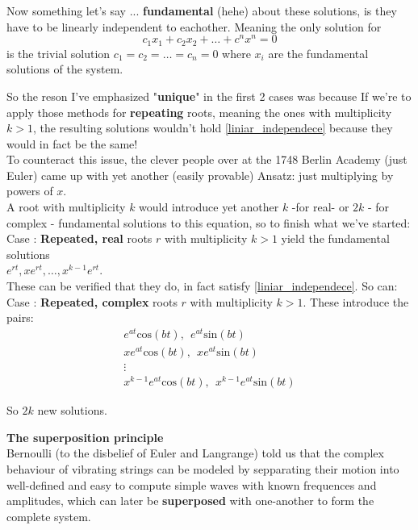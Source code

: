 Now something let's say ... \textbf{fundamental} (hehe) about these solutions, is they have to be linearly independent to eachother. Meaning the only solution for
\begin{equation}\label{liniar_independece}
    c_1 x_1+c_2 x_2 + \dots + c^n x^n = 0
\end{equation}
is the trivial solution $c_1=c_2=\dots=c_n=0$ where $x_i$ are the fundamental solutions of the system.

So the reson I've emphasized "\textbf{unique}" in the first 2 cases was because If we're to apply those methods for \textbf{repeating} roots, meaning the ones with multiplicity $k>1$, the resulting solutions wouldn't hold \ref{liniar_independece} because they would in fact be the same! \\

To counteract this issue, the clever people over at the 1748 Berlin Academy (just Euler) came up with yet another (easily provable) Ansatz: just multiplying by powers of $x$. \\

A root with multiplicity $k$ would introduce yet another $k$ -for real- or $2k$ - for complex - fundamental solutions to this equation, so to finish what we've started:\\

Case : \textbf{Repeated, real} roots $r$ with multiplicity $k>1$ yield the fundamental solutions \\ $e^{rt}, xe^{rt}, \dots,x^{k-1}e^{rt}$. \\
These can be verified that they do, in fact satisfy \ref{liniar_independece}. So can: \\

Case : \textbf{Repeated, complex} roots $r$ with multiplicity $k>1$. These introduce the pairs:
\begin{align*}
    e^{at}\text{cos}(bt), \ \  e^{at}\text{sin}(bt)  \\
    xe^{at}\text{cos}(bt), \ \ xe^{at}\text{sin}(bt) \\
    \vdots                                           \\
    x^{k-1}e^{at}\text{cos}(bt), \ \ x^{k-1}e^{at}\text{sin}(bt)
\end{align*}

So $2k$ new solutions.


\textbf{The superposition principle} \\
Bernoulli (to the disbelief of Euler and Langrange) told us that the complex behaviour of vibrating strings can be modeled by sepparating their motion into well-defined and easy to compute simple waves with known frequences and amplitudes, which can later be \textbf{superposed} with one-another to form the complete system.
\\

